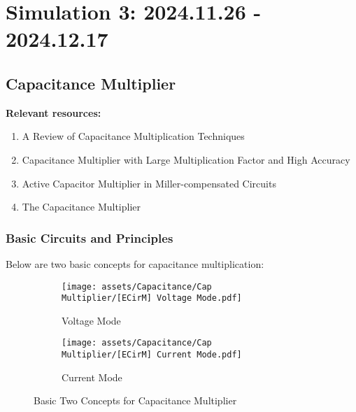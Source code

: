 \documentclass[D:/a_RemoteRepo/GH.LatexNotes/.demo/Analog_Circuits_Handbook.tex]{subfiles}
\begin{document}
\chapter{Simulation 3: 2024.11.26 - 2024.12.17}\thispagestyle{fancy}


\setcounter{page}{51}
\setcounter{chapter}{12}

\section{Capacitance Multiplier}

\begin{graybox}
\textbf{Relevant resources: }
\begin{enumerate}
\item A Review of Capacitance Multiplication Techniques 

\item Capacitance Multiplier with Large Multiplication Factor and High Accuracy \\

\item Active Capacitor Multiplier in Miller-compensated Circuits 

\item The Capacitance Multiplier 
\end{enumerate}
\end{graybox}

\subsection{Basic Circuits and Principles}

Below are two basic concepts for capacitance multiplication:
\begin{figure}[H]\centering
\begin{subfigure}[b]{0.5\columnwidth}\centering
    \texttt{[image: assets/Capacitance/Cap Multiplier/[ECirM] Voltage Mode.pdf]}
    \caption{Voltage Mode}
\end{subfigure}\hfill
\begin{subfigure}[b]{0.5\columnwidth}\centering
    \texttt{[image: assets/Capacitance/Cap Multiplier/[ECirM] Current Mode.pdf]}
    \caption{Current Mode}
\end{subfigure}
\caption{Basic Two Concepts for Capacitance Multiplier}
\end{figure}
\end{document}
